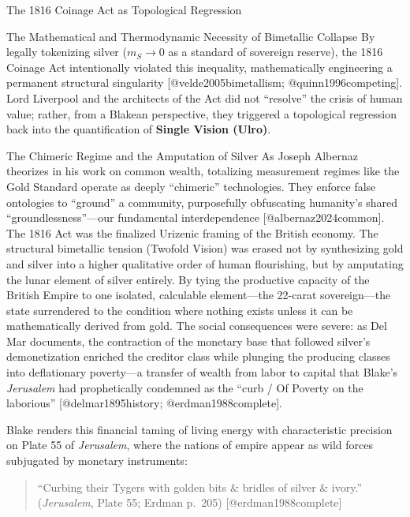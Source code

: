 \documentclass[
  ignorenonframetext,
]{beamer}
\begin{document}
\begin{frame}{The 1816 Coinage Act as Topological Regression}
\begin{block}{The Mathematical and Thermodynamic Necessity of Bimetallic
Collapse}
By legally tokenizing silver (\(m_S \to 0\) as a standard of sovereign
reserve), the 1816 Coinage Act intentionally violated this inequality,
mathematically engineering a permanent structural singularity
{[}@velde2005bimetallism; @quinn1996competing{]}. Lord Liverpool and the
architects of the Act did not ``resolve'' the crisis of human value;
rather, from a Blakean perspective, they triggered a topological
regression back into the quantification of \textbf{Single Vision
(Ulro)}.
\end{block}

\begin{block}{The Chimeric Regime and the Amputation of Silver}
\protect{}\label{the-chimeric-regime-and-the-amputation-of-silver}
As Joseph Albernaz theorizes in his work on common wealth, totalizing
measurement regimes like the Gold Standard operate as deeply
``chimeric'' technologies. They enforce false ontologies to ``ground'' a
community, purposefully obfuscating humanity's shared
``groundlessness''---our fundamental interdependence
{[}@albernaz2024common{]}. The 1816 Act was the finalized Urizenic
framing of the British economy. The structural bimetallic tension
(Twofold Vision) was erased not by synthesizing gold and silver into a
higher qualitative order of human flourishing, but by amputating the
lunar element of silver entirely. By tying the productive capacity of
the British Empire to one isolated, calculable element---the 22-carat
sovereign---the state surrendered to the condition where nothing exists
unless it can be mathematically derived from gold. The social
consequences were severe: as Del Mar documents, the contraction of the
monetary base that followed silver's demonetization enriched the
creditor class while plunging the producing classes into deflationary
poverty---a transfer of wealth from labor to capital that Blake's
\emph{Jerusalem} had prophetically condemned as the ``curb / Of Poverty
on the laborious'' {[}@delmar1895history; @erdman1988complete{]}.

Blake renders this financial taming of living energy with characteristic
precision on Plate 55 of \emph{Jerusalem}, where the nations of empire
appear as wild forces subjugated by monetary instruments:

\begin{quote}
``Curbing their Tygers with golden bits \& bridles of silver \& ivory.''
(\emph{Jerusalem}, Plate 55; Erdman p.~205) {[}@erdman1988complete{]}
\end{quote}


\end{block}
\end{frame}
\end{document}
